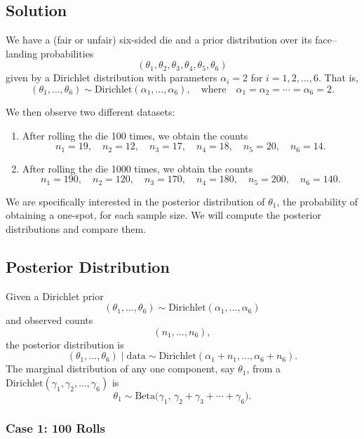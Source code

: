 \documentclass[final,11pt]{article}
\begin{document}
\begin{spacing}{1.25}
\section*{Solution}


We have a (fair or unfair) six-sided die and a prior distribution over its face--landing probabilities 
\[
(\theta_1, \theta_2, \theta_3, \theta_4, \theta_5, \theta_6)
\]
given by a Dirichlet distribution with parameters \(\alpha_i = 2\) for \(i=1,2,\ldots,6\). That is,
\[
(\theta_1,\ldots,\theta_6) \sim \text{Dirichlet}(\alpha_1,\ldots,\alpha_6), 
\quad\text{where}\quad \alpha_1 = \alpha_2 = \cdots = \alpha_6 = 2.
\]

We then observe two different datasets:

\begin{enumerate}
    \item After rolling the die 100 times, we obtain the counts 
    \[
    n_1 = 19,\quad n_2 = 12,\quad n_3 = 17,\quad n_4 = 18,\quad n_5 = 20,\quad n_6 = 14.
    \]
    \item After rolling the die 1000 times, we obtain the counts 
    \[
    n_1 = 190,\quad n_2 = 120,\quad n_3 = 170,\quad n_4 = 180,\quad n_5 = 200,\quad n_6 = 140.
    \]
\end{enumerate}

We are specifically interested in the posterior distribution of \(\theta_1\), the probability of obtaining a one-spot, for each sample size. We will compute the posterior distributions and compare them.

\subsection*{Posterior Distribution}

Given a Dirichlet prior 
\[
(\theta_1,\ldots,\theta_6) \sim \text{Dirichlet}(\alpha_1, \ldots, \alpha_6)
\]
and observed counts 
\[
(n_1,\ldots,n_6),
\]
the posterior distribution is 
\[
(\theta_1,\ldots,\theta_6) \mid \text{data} \sim \text{Dirichlet}(\alpha_1 + n_1, \ldots, \alpha_6 + n_6).
\]
The marginal distribution of any one component, say \(\theta_1\), from a 
\(\text{Dirichlet}(\gamma_1,\gamma_2,\ldots,\gamma_6)\) is 
\[
\theta_1 \sim \text{Beta}\!\bigl(\gamma_1,\,\gamma_2+\gamma_3+\cdots+\gamma_6\bigr).
\]

\subsubsection*{Case 1: 100 Rolls}


\end{spacing}
\end{document}
